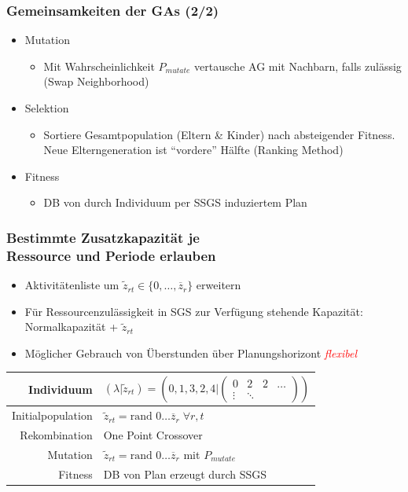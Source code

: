 \begin{frame}
\frametitle{Gemeinsamkeiten der GAs (2/2)}
\begin{itemize}
\item Mutation
\begin{itemize}\item Mit Wahrscheinlichkeit $P_{mutate}$ vertausche AG mit Nachbarn, falls zulässig (Swap Neighborhood)\\[3mm]\end{itemize}
\item Selektion
\begin{itemize}\item Sortiere Gesamtpopulation (Eltern \& Kinder) nach absteigender Fitness. Neue Elterngeneration ist ``vordere'' Hälfte (Ranking Method)\\[3mm]\end{itemize}
\item Fitness \begin{itemize}\item DB von durch Individuum per SSGS induziertem Plan\end{itemize}
\end{itemize}
\end{frame}

\begin{frame}
\frametitle{Bestimmte Zusatzkapazität je\\Ressource und Periode erlauben}

\begin{itemize}
\item Aktivitätenliste um $\tilde{z}_{rt} \in \{0, \ldots, \overline{z}_r \}$ erweitern
\item Für Ressourcenzulässigkeit in SGS zur Verfügung stehende Kapazität: Normalkapazität + $\tilde{z}_{rt}$
\item Möglicher Gebrauch von Überstunden über Planungshorizont \textcolor{red}{\emph{flexibel}}
\end{itemize}

\begin{small}
\begin{center}
\begin{tabular}{rl}
\hline 
Individuum & $(\lambda|\tilde{z}_{rt})=(0,1,3,2,4|\begin{pmatrix} 0 & 2 & 2 & \ldots\\ \vdots & \ddots \end{pmatrix})$\parbox[c][40pt][c]{0pt}{}\tabularnewline
\hline 
Initialpopulation & $\tilde{z}_{rt}=\mbox{rand }0\ldots\overline{z}_{r}\;\forall r,t$\tabularnewline
\hline 
Rekombination & One Point Crossover\tabularnewline
\hline 
Mutation & $\tilde{z}_{rt}=\mbox{rand }0\ldots\overline{z}_{r}$ mit $P_{mutate}$\tabularnewline
\hline 
Fitness & DB von Plan erzeugt durch SSGS\tabularnewline
\hline 
\end{tabular}
\end{center}
\end{small}
\end{frame}

